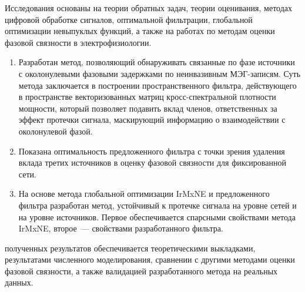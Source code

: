 {\methods}
Исследования основаны на теории обратных задач, теории оценивания,
методах цифровой обработке сигналов, оптимальной фильтрации,
глобальной оптимизации невыпуклых функций, а также на работах
по методам оценки фазовой связности в электрофизиологии.

{}
\begin{enumerate}
  \item Разработан метод, позволяющий обнаруживать связанные по фазе источники с околонулевыми фазовыми задержками
      по неинвазивным МЭГ-записям. Суть метода заключается в построении пространственного фильтра,
      действующего в пространстве векторизованных матриц кросс-спектральной плотности мощности,
      который позволяет подавить вклад членов, ответственных за эффект протечки сигнала, маскирующий
      информацию о взаимодействии с околонулевой фазой.
  \item Показана оптимальность предложенного фильтра с точки зрения удаления вклада третих источников
      в оценку фазовой связности для фиксированной сети.
  \item На основе метода глобальной оптимизации IrMxNE и предложенного фильтра разработан метод,
      устойчивый к протечке сигнала на уровне сетей и на уровне источников. Первое обеспечивается
      спарсными свойствами метода IrMxNE, второе~--- свойствами разработанного фильтра.
\end{enumerate}

{\reliability} полученных результатов обеспечивается теоретическими выкладками, результатами численного моделирования,
сравнении с другими методами оценки фазовой связности, а также
валидацией разработанного метода на реальных данных.

{\probation}


